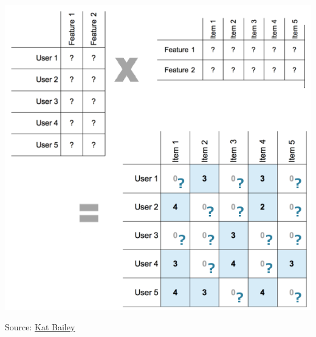 \documentclass[11pt]{beamer}
\begin{document}
\begin{frame}
\begin{columns}
\begin{column}{0.4\textwidth}
\begin{center}
					\includegraphics[width=\textwidth]{images/matrix_factorization.png}
					
					{\tiny Source: \href{https://katbailey.github.io/post/matrix-factorization-with-tensorflow/}{\color{blue} Kat Bailey}}
				\end{center}
			\end{column}
		\end{columns}
	\end{frame}
\end{document}
